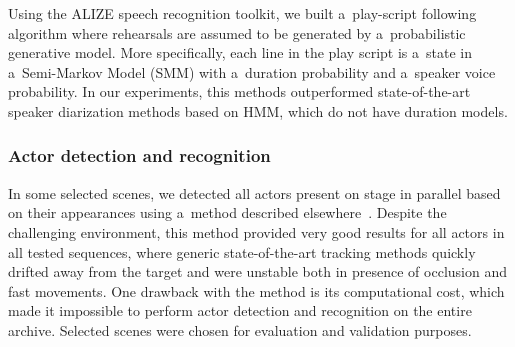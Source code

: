 \documentclass[conference]{IEEEtran}
\begin{document}
Using the ALIZE speech recognition toolkit, we built a~play-script following algorithm where rehearsals are assumed to be generated by a~probabilistic generative model.  More specifically, each  line in the play script is a~state in a~Semi-Markov Model (SMM) with a~duration probability and a~speaker voice probability. In our experiments, this methods outperformed state-of-the-art speaker diarization methods based on HMM, which do not have duration models. %
 



\subsubsection{Actor detection and recognition} 

In some selected scenes, we  detected all actors present on stage in parallel based on their appearances
using a~method described elsewhere~\cite{Gandhi13}. Despite the challenging environment, this method provided very good results for  all actors in all tested sequences, where generic state-of-the-art tracking methods quickly drifted away from the target and were unstable both in presence of occlusion and fast movements. One drawback with the method is its computational cost, which made it impossible to perform
actor detection and recognition on the entire archive. Selected scenes were chosen for evaluation and validation purposes.

\end{document}
